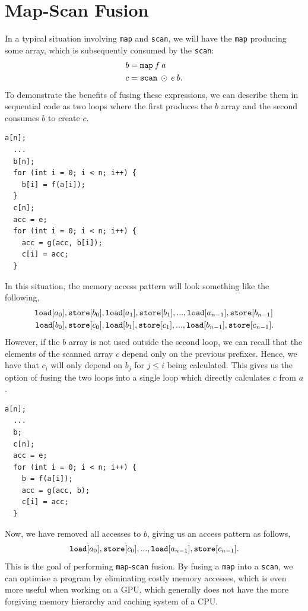 \documentclass[11pt,bibliography=totocnumbered]{article}
\begin{document}
\section{Map-Scan Fusion}
In a typical situation involving \texttt{map} and \texttt{scan}, we will have the \texttt{map} producing some array, which is subsequently
 consumed by the \texttt{scan}:
\begin{align*}
  b &= \mathtt{map} \: f \: a \\
  c &= \mathtt{scan} \: \odot \: e \: b\mathnormal{.}
\end{align*}
To demonstrate the benefits of fusing these expressions, we can describe them in sequential code as two loops where the first produces the $b$ array and the second consumes $b$ to create $c$.
\begin{lstlisting}[caption=\texttt{map} and \texttt{scan} as sequential loops.]
  a[n];
  ...
  b[n];
  for (int i = 0; i < n; i++) {
    b[i] = f(a[i]);
  }
  c[n];
  acc = e;
  for (int i = 0; i < n; i++) {
    acc = g(acc, b[i]);
    c[i] = acc;
  }
\end{lstlisting}
In this situation, the memory access pattern will look something like the following,
\begin{align*}
  \mathtt{load}[a_0]&, \mathtt{store}[b_0], \mathtt{load}[a_1], \mathtt{store}[b_1], ..., \mathtt{load}[a_{n-1}], \mathtt{store}[b_{n-1}] \\
  \mathtt{load}[b_0]&, \mathtt{store}[c_0], \mathtt{load}[b_1], \mathtt{store}[c_1], ..., \mathtt{load}[b_{n-1}], \mathtt{store}[c_{n-1}]\mathnormal{.}
\end{align*}
However, if the $b$ array is not used outside the second loop, we can recall that the elements of the scanned array $c$ depend only on the previous prefixes. 
Hence, we have that $c_i$ will only depend on $b_j$ for $j \leq i$ being calculated. This gives us the option of fusing the two loops into a single loop which directly calculates $c$ from $a$.
\begin{lstlisting}[caption=\texttt{map} and \texttt{scan} loops fused.]
  a[n];
  ...
  b;
  c[n];
  acc = e;
  for (int i = 0; i < n; i++) {
    b = f(a[i]);
    acc = g(acc, b);
    c[i] = acc;
  }
\end{lstlisting}
Now, we have removed all accesses to $b$, giving us an access pattern as follows,
 $$\mathtt{load}[a_0],  \mathtt{store}[c_0], ..., \mathtt{load}[a_{n-1}],  \mathtt{store}[c_{n-1}]\mathnormal{.}$$
This is the goal of performing \texttt{map}-\texttt{scan} fusion. By fusing a \texttt{map} into a \texttt{scan}, we can optimise a program by eliminating costly memory accesses,
 which is even more useful when working on a GPU, which generally does not have the more forgiving memory hierarchy and caching system of a CPU.
\end{document}
